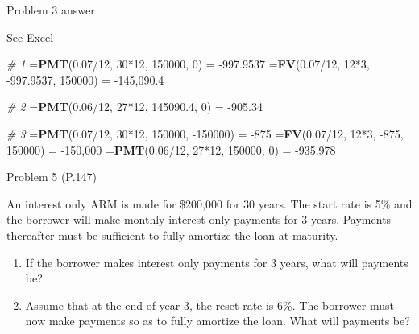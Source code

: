 \documentclass[ignorenonframetext,]{beamer}
\newenvironment{Shaded}{\begin{snugshade}}{\end{snugshade}}
\newcommand{\KeywordTok}[1]{\textcolor[rgb]{0.13,0.29,0.53}{\textbf{{#1}}}}
\newcommand{\DecValTok}[1]{\textcolor[rgb]{0.00,0.00,0.81}{{#1}}}
\newcommand{\FloatTok}[1]{\textcolor[rgb]{0.00,0.00,0.81}{{#1}}}
\newcommand{\StringTok}[1]{\textcolor[rgb]{0.31,0.60,0.02}{{#1}}}
\newcommand{\CommentTok}[1]{\textcolor[rgb]{0.56,0.35,0.01}{\textit{{#1}}}}
\newcommand{\NormalTok}[1]{{#1}}
\providecommand{\tightlist}{%
\setlength{\itemsep}{0pt}\setlength{\parskip}{0pt}}
\begin{document}
\begin{frame}[fragile]{Problem 3 answer}

\begin{Shaded}
\begin{Highlighting}[]
\NormalTok{See Excel}

\CommentTok{# 1}
\NormalTok{=}\KeywordTok{PMT}\NormalTok{(}\FloatTok{0.07}\NormalTok{/}\DecValTok{12}\NormalTok{, }\DecValTok{30}\NormalTok{*}\DecValTok{12}\NormalTok{, }\DecValTok{150000}\NormalTok{, }\DecValTok{0}\NormalTok{) =}\StringTok{ }\NormalTok{-}\FloatTok{997.9537}
\NormalTok{=}\KeywordTok{FV}\NormalTok{(}\FloatTok{0.07}\NormalTok{/}\DecValTok{12}\NormalTok{, }\DecValTok{12}\NormalTok{*}\DecValTok{3}\NormalTok{, -}\FloatTok{997.9537}\NormalTok{, }\DecValTok{150000}\NormalTok{) =}\StringTok{ }\NormalTok{-}\DecValTok{145}\NormalTok{,}\FloatTok{090.4}

\CommentTok{# 2}
\NormalTok{=}\KeywordTok{PMT}\NormalTok{(}\FloatTok{0.06}\NormalTok{/}\DecValTok{12}\NormalTok{, }\DecValTok{27}\NormalTok{*}\DecValTok{12}\NormalTok{, }\FloatTok{145090.4}\NormalTok{, }\DecValTok{0}\NormalTok{) =}\StringTok{ }\NormalTok{-}\FloatTok{905.34}

\CommentTok{# 3}
\NormalTok{=}\KeywordTok{PMT}\NormalTok{(}\FloatTok{0.07}\NormalTok{/}\DecValTok{12}\NormalTok{, }\DecValTok{30}\NormalTok{*}\DecValTok{12}\NormalTok{, }\DecValTok{150000}\NormalTok{, -}\DecValTok{150000}\NormalTok{) =}\StringTok{ }\NormalTok{-}\DecValTok{875}
\NormalTok{=}\KeywordTok{FV}\NormalTok{(}\FloatTok{0.07}\NormalTok{/}\DecValTok{12}\NormalTok{, }\DecValTok{12}\NormalTok{*}\DecValTok{3}\NormalTok{, -}\DecValTok{875}\NormalTok{, }\DecValTok{150000}\NormalTok{) =}\StringTok{ }\NormalTok{-}\DecValTok{150}\NormalTok{,}\DecValTok{000}
\NormalTok{=}\KeywordTok{PMT}\NormalTok{(}\FloatTok{0.06}\NormalTok{/}\DecValTok{12}\NormalTok{, }\DecValTok{27}\NormalTok{*}\DecValTok{12}\NormalTok{, }\DecValTok{150000}\NormalTok{, }\DecValTok{0}\NormalTok{) =}\StringTok{ }\NormalTok{-}\FloatTok{935.978}
\end{Highlighting}
\end{Shaded}

\normalsize

\end{frame}

\begin{frame}{Problem 5 (P.147)}

\small

An interest only ARM is made for \$200,000 for 30 years. The start rate
is 5\% and the borrower will make monthly interest only payments for 3
years. Payments thereafter must be sufficient to fully amortize the loan
at maturity.

\begin{enumerate}
\def\labelenumi{\alph{enumi}.}
\tightlist
\item
  If the borrower makes interest only payments for 3 years, what will
  payments be?
\item
  Assume that at the end of year 3, the reset rate is 6\%. The borrower
  must now make payments so as to fully amortize the loan. What will
  payments be?
\end{enumerate}

\end{frame}
\end{document}

